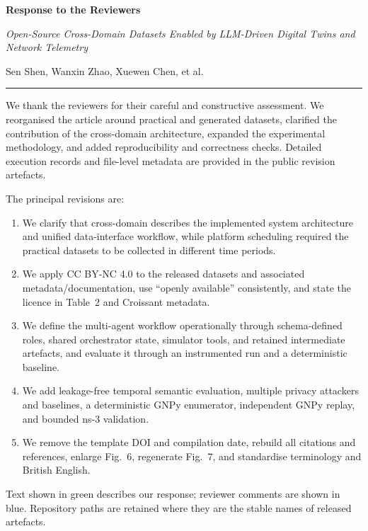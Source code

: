 \documentclass[11pt]{article}
\newcommand{\manutitle}{Open-Source Cross-Domain Datasets Enabled by LLM-Driven Digital Twins and Network Telemetry}
\begin{document}
\begin{center}
{\Large\bfseries Response to the Reviewers}\par
\vspace{0.4em}
{\large\itshape \manutitle}\par
\vspace{0.6em}
Sen Shen, Wanxin Zhao, Xuewen Chen, et al.
\end{center}

\hrule
\vspace{0.8em}

We thank the reviewers for their careful and constructive assessment. We reorganised the article around practical and generated datasets, clarified the contribution of the cross-domain architecture, expanded the experimental methodology, and added reproducibility and correctness checks. Detailed execution records and file-level metadata are provided in the public revision artefacts.

The principal revisions are:
\begin{enumerate}[leftmargin=1.6em]
  \item We clarify that cross-domain describes the implemented system architecture and unified data-interface workflow, while platform scheduling required the practical datasets to be collected in different time periods.
  \item We apply CC BY-NC 4.0 to the released datasets and associated metadata/documentation, use ``openly available'' consistently, and state the licence in Table~2 and Croissant metadata.
  \item We define the multi-agent workflow operationally through schema-defined roles, shared orchestrator state, simulator tools, and retained intermediate artefacts, and evaluate it through an instrumented run and a deterministic baseline.
  \item We add leakage-free temporal semantic evaluation, multiple privacy attackers and baselines, a deterministic GNPy enumerator, independent GNPy replay, and bounded ns-3 validation.
  \item We remove the template DOI and compilation date, rebuild all citations and references, enlarge Fig.~6, regenerate Fig.~7, and standardise terminology and British English.
\end{enumerate}

Text shown in green describes our response; reviewer comments are shown in blue. Repository paths are retained where they are the stable names of released artefacts.
\end{document}
